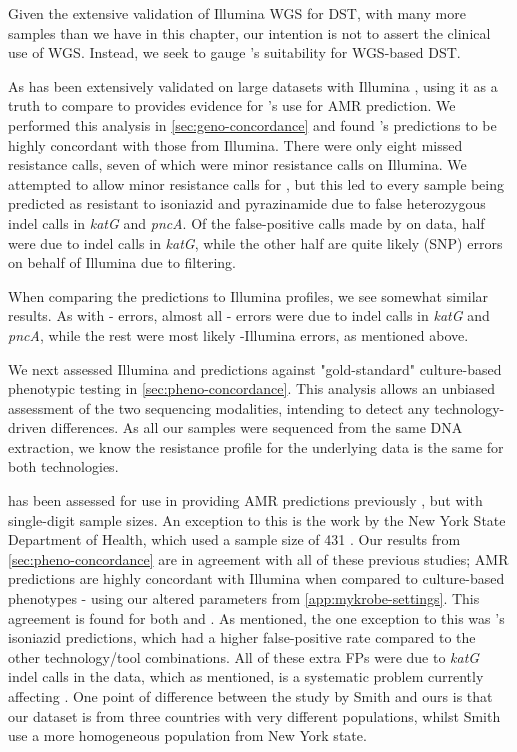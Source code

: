 \hspace{0.75cm}

\noindent
Given the extensive validation of Illumina WGS for DST, with many more samples than we have in this chapter, our intention is not to assert the clinical use of WGS. Instead, we seek to gauge \ont{}'s suitability for WGS-based DST. 

As \mykrobe{} has been extensively validated on large datasets with Illumina \cite{bradley2015,hunt2019}, using it as a truth to compare \ont{} to provides evidence for \ont{}'s use for AMR prediction. We performed this analysis in \autoref{sec:geno-concordance} and found \mykrobe{}'s \ont{} predictions to be highly concordant with those from Illumina. There were only eight missed resistance calls, seven of which were minor resistance calls on Illumina. We attempted to allow minor resistance calls for \ont{}, but this led to every sample being predicted as resistant to isoniazid and pyrazinamide due to false heterozygous indel calls in \textit{katG} and \textit{pncA}. Of the false-positive calls made by \mykrobe{} on \ont{} data, half were due to indel calls in \textit{katG}, while the other half are quite likely (SNP) errors on behalf of Illumina due to filtering.

When comparing the \drprg{} predictions to \mykrobe{} Illumina profiles, we see somewhat similar results. As with \mykrobe{}-\ont{} errors, almost all \drprg{}-\ont{} errors were due to indel calls in \textit{katG} and \textit{pncA}, while the rest were most likely \mykrobe{}-Illumina errors, as mentioned above. 

\noindent
We next assessed Illumina and \ont{} predictions against "gold-standard" culture-based phenotypic testing in \autoref{sec:pheno-concordance}. This analysis allows an unbiased assessment of the two sequencing modalities, intending to detect any technology-driven differences. As all our samples were sequenced from the same DNA extraction, we know the resistance profile for the underlying data is the same for both technologies. 

\ont{} has been assessed for use in providing AMR predictions previously \cite{bradley2015,hunt2019,phelan2019}, but with single-digit sample sizes. An exception to this is the work by the New York State Department of Health, which used a sample size of 431 \cite{smith2020}. Our results from \autoref{sec:pheno-concordance} are in agreement with all of these previous studies; \ont{} AMR predictions are highly concordant with Illumina when compared to culture-based phenotypes - using our altered parameters from \autoref{app:mykrobe-settings}. This agreement is found for both \mykrobe{} and \drprg{}. As mentioned, the one exception to this was \mykrobe{}'s \ont{} isoniazid predictions, which had a higher false-positive rate compared to the other technology/tool combinations. All of these extra FPs were due to \textit{katG} indel calls in the \ont{} data, which as mentioned, is a systematic problem currently affecting \ont{} \cite{watson2019}. One point of difference between the \ont{} study by Smith \etal{} and ours is that our dataset is from three countries with very different \mtb{} populations, whilst Smith \etal{} use a more homogeneous population from New York state. 

